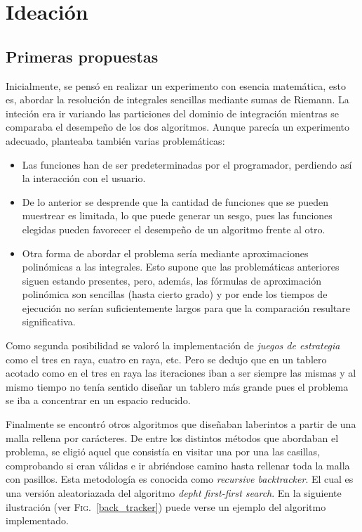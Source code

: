 \documentclass[12pt,a4paper]{article}
\begin{document}
\section{Ideación}
\subsection{Primeras propuestas}

Inicialmente, se pensó en realizar un experimento con esencia matemática, esto es, abordar la resolución de integrales sencillas mediante sumas de Riemann. La inteción era ir variando las particiones del dominio de integración mientras se comparaba el desempeño de los dos algoritmos. Aunque parecía un experimento adecuado, planteaba también varias problemáticas: 

\begin{itemize}
	\item Las funciones han de ser predeterminadas por el programador, perdiendo así la interacción con el usuario.
	\item De lo anterior se desprende que la cantidad de funciones que se pueden muestrear es limitada, lo que puede generar un sesgo, pues las funciones elegidas pueden favorecer el desempeño de un algoritmo frente al otro. 
	\item Otra forma de abordar el problema sería mediante aproximaciones polinómicas a las integrales. Esto supone que las problemáticas anteriores siguen estando presentes, pero, además, las fórmulas de aproximación polinómica son sencillas (hasta cierto grado) y por ende los tiempos de ejecución no serían suficientemente largos para que la comparación resultare significativa. 
\end{itemize}

Como segunda posibilidad se valoró la implementación de \textit{juegos de estrategia} como el tres en raya, cuatro en raya, etc. Pero se dedujo que en un tablero acotado como en el tres en raya las iteraciones iban a ser siempre las mismas y al mismo tiempo no tenía sentido diseñar un tablero más grande pues el problema se iba a concentrar en un espacio reducido.

Finalmente se encontró otros algoritmos que diseñaban laberintos a partir de una malla rellena por carácteres. De entre los distintos métodos que abordaban el problema, se eligió aquel que consistía en visitar una por una las casillas, comprobando si eran válidas e ir abriéndose camino hasta rellenar toda la malla con pasillos. Esta metodología es conocida como \textit{recursive backtracker}\cite{wiki}. El cual es una versión aleatoriazada del algoritmo \textit{depht first-first search}. En la siguiente ilustración (ver \textsc{Fig.}~\ref{back_tracker}) puede verse un ejemplo del algoritmo implementado.
\end{document}
